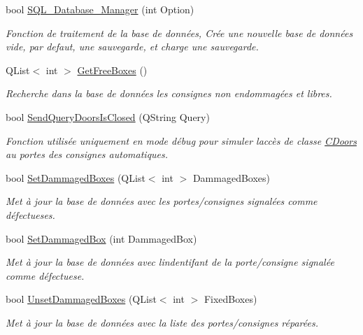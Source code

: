 \begin{DoxyCompactItemize}
bool \hyperlink{class_c_s_q_lite___local___d_b_ad8e4895a47708bc5f3e5abce00be1853}{S\+Q\+L\+\_\+\+Database\+\_\+\+Manager} (int Option)
\begin{DoxyCompactList}\small\item\em Fonction de traitement de la base de données, Crée une nouvelle base de données vide, par defaut, une sauvegarde, et charge une sauvegarde. \end{DoxyCompactList}\item 
Q\+List$<$ int $>$ \hyperlink{class_c_s_q_lite___local___d_b_a33f1aa3666a7af30e1cc36b228fb59fe}{Get\+Free\+Boxes} ()
\begin{DoxyCompactList}\small\item\em Recherche dans la base de données les consignes non endommagées et libres. \end{DoxyCompactList}\item 
bool \hyperlink{class_c_s_q_lite___local___d_b_a0c2471f87f624ad3e5a99f21dcd399da}{Send\+Query\+Doors\+Is\+Closed} (Q\+String Query)
\begin{DoxyCompactList}\small\item\em Fonction utilisée uniquement en mode débug pour simuler l\textquotesingle{}accès de classe \hyperlink{class_c_doors}{C\+Doors} au portes des consignes automatiques. \end{DoxyCompactList}\item 
bool \hyperlink{class_c_s_q_lite___local___d_b_a325a7cb7c3203d66be49eb4d7c8806c7}{Set\+Dammaged\+Boxes} (Q\+List$<$ int $>$ Dammaged\+Boxes)
\begin{DoxyCompactList}\small\item\em Met à jour la base de données avec les portes/consignes signalées comme défectueses. \end{DoxyCompactList}\item 
bool \hyperlink{class_c_s_q_lite___local___d_b_a290823544987587c6cb71287428752fe}{Set\+Dammaged\+Box} (int Dammaged\+Box)
\begin{DoxyCompactList}\small\item\em Met à jour la base de données avec l\textquotesingle{}indentifant de la porte/consigne signalée comme défectuese. \end{DoxyCompactList}\item 
bool \hyperlink{class_c_s_q_lite___local___d_b_ad29bd0aa57329a11e77a1277a01e41e4}{Unset\+Dammaged\+Boxes} (Q\+List$<$ int $>$ Fixed\+Boxes)
\begin{DoxyCompactList}\small\item\em Met à jour la base de données avec la liste des portes/consignes réparées. \end{DoxyCompactList}\item 

\end{DoxyCompactItemize}
